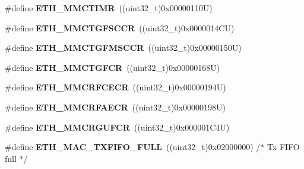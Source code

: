 \begin{DoxyCompactItemize}
\item 
\hypertarget{group___h_a_l___e_t_h___aliased___defines_gad0e2ddcc50c96772130c9717aa1ec496}{\#define {\bfseries E\-T\-H\-\_\-\-M\-M\-C\-T\-I\-M\-R}~((uint32\-\_\-t)0x00000110\-U)}\label{group___h_a_l___e_t_h___aliased___defines_gad0e2ddcc50c96772130c9717aa1ec496}

\item 
\hypertarget{group___h_a_l___e_t_h___aliased___defines_ga355a8ef08cc4a431601016a076ae9562}{\#define {\bfseries E\-T\-H\-\_\-\-M\-M\-C\-T\-G\-F\-S\-C\-C\-R}~((uint32\-\_\-t)0x0000014\-C\-U)}\label{group___h_a_l___e_t_h___aliased___defines_ga355a8ef08cc4a431601016a076ae9562}

\item 
\hypertarget{group___h_a_l___e_t_h___aliased___defines_gad2324378454cb5afc2709afc6849067d}{\#define {\bfseries E\-T\-H\-\_\-\-M\-M\-C\-T\-G\-F\-M\-S\-C\-C\-R}~((uint32\-\_\-t)0x00000150\-U)}\label{group___h_a_l___e_t_h___aliased___defines_gad2324378454cb5afc2709afc6849067d}

\item 
\hypertarget{group___h_a_l___e_t_h___aliased___defines_ga1de87b7bf29865be1068300dd2946caf}{\#define {\bfseries E\-T\-H\-\_\-\-M\-M\-C\-T\-G\-F\-C\-R}~((uint32\-\_\-t)0x00000168\-U)}\label{group___h_a_l___e_t_h___aliased___defines_ga1de87b7bf29865be1068300dd2946caf}

\item 
\hypertarget{group___h_a_l___e_t_h___aliased___defines_gacb9b04ab9c5957905a2db7314d6907b8}{\#define {\bfseries E\-T\-H\-\_\-\-M\-M\-C\-R\-F\-C\-E\-C\-R}~((uint32\-\_\-t)0x00000194\-U)}\label{group___h_a_l___e_t_h___aliased___defines_gacb9b04ab9c5957905a2db7314d6907b8}

\item 
\hypertarget{group___h_a_l___e_t_h___aliased___defines_ga99f6ddc380fffdfe66e6659f7c4ba325}{\#define {\bfseries E\-T\-H\-\_\-\-M\-M\-C\-R\-F\-A\-E\-C\-R}~((uint32\-\_\-t)0x00000198\-U)}\label{group___h_a_l___e_t_h___aliased___defines_ga99f6ddc380fffdfe66e6659f7c4ba325}

\item 
\hypertarget{group___h_a_l___e_t_h___aliased___defines_gadd605f380a482a06a59498eea4cad15f}{\#define {\bfseries E\-T\-H\-\_\-\-M\-M\-C\-R\-G\-U\-F\-C\-R}~((uint32\-\_\-t)0x000001\-C4\-U)}\label{group___h_a_l___e_t_h___aliased___defines_gadd605f380a482a06a59498eea4cad15f}

\item 
\hypertarget{group___h_a_l___e_t_h___aliased___defines_ga568f5f8aa8a6dc34f446e303adac0e6d}{\#define {\bfseries E\-T\-H\-\_\-\-M\-A\-C\-\_\-\-T\-X\-F\-I\-F\-O\-\_\-\-F\-U\-L\-L}~((uint32\-\_\-t)0x02000000)  /$\ast$ Tx F\-I\-F\-O full $\ast$/}\label{group___h_a_l___e_t_h___aliased___defines_ga568f5f8aa8a6dc34f446e303adac0e6d}


\end{DoxyCompactItemize}
